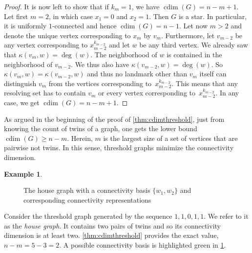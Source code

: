 \documentclass[letterpaper,12pt,headings=normal,parskip=half]{scrartcl}
\DeclareMathOperator{\cdim}{cdim}
\theoremstyle{definition}
\newtheorem{example}[theorem]{Example}
\begin{document}
\begin{proof}
    It is now left to show that if $k_m=1$, we have $\cdim(G)=n-m+1$. Let first $m=2$, in which case $x_1=0$ and $x_2=1$. 
    Then $G$ is a star.
    In particular, it is uniformly \mbox{$1$-connected} and hence $\cdim(G)=n-1$. 
    Let now $m>2$ and denote the unique vertex corresponding to $x_m$ by $v_m$. Furthermore, let $v_{m-2}$ be any vertex corresponding to $x_{m-2}^{k_{m-2}}$ and let $w$ be any third vertex. 
    We already saw that $\kappa(v_m,w)=\deg(w)$. 
    The neighborhood of $w$ is contained in the neighborhood of $v_{m-2}$. 
    We thus also have $\kappa(v_{m-2},w)=\deg(w)$. 
    So $\kappa(v_m,w)=\kappa(v_{m-2},w)$ and thus no landmark other than $v_m$ itself can distinguish $v_m$ from the vertices corresponding to~$x_{m-2}^{k_{m-2}}$. 
    This means that any resolving set has to contain $v_m$ or every vertex corresponding to~$x_{m-2}^{k_{m-2}}$. 
    In any case, we get $\cdim(G)=n-m+1$.
\end{proof}

As argued in the beginning of the proof of \cref{thm:cdimthreshold}, just from knowing the count of twins of a graph, one gets the lower bound $\cdim(G)\geq n-m$. Herein, $m$ is the largest size of a set of vertices that are pairwise not twins.
In this sense, threshold graphs minimize the connectivity dimension.

\begin{example}\label{ex:house}
\begin{figure}
        \centering
        \caption{The house graph with a connectivity basis $\{w_1,w_2\}$ and corresponding connectivity representations}
        \label{fig:house}
    \end{figure}
    Consider the threshold graph generated by the sequence $1,1,0,1,1$.
    We refer to it as the \emph{house graph}. 
    It contains two pairs of twins and so its connectivity dimension is at least two. 
    \cref{thm:cdimthreshold} provides the exact value, $n-m=5-3=2$.
    A possible connectivity basis is highlighted green in \cref{fig:house}.
\end{example}
\end{document}
